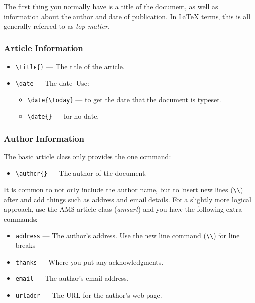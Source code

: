 \documentclass{article}  %
\begin{document}
The first thing you normally have is a title of the document, as well as
information about the author and date of publication.  In \LaTeX{} terms,
this is all generally referred to as \emph{top matter}.

\subsubsection{Article Information}
\label{sec:article-information}

\begin{itemize}
\item \verb|\title{}| --- The title of the article.
\item \verb|\date| --- The date. Use:
  \begin{itemize}
  \item \verb|\date{\today}| --- to get the date that the document is typeset.
  \item \verb|\date{}| --- for no date.
  \end{itemize}
\end{itemize}

\subsubsection{Author Information}
\label{sec:author-information}
  
The basic article class only provides the one command:
\begin{itemize}
\item \verb|\author{}| --- The author of the document.
\end{itemize}

It is common to not only include the author name, but to insert new lines (\verb|\\|)
after and add things such as address and email details.  For a slightly more logical
approach, use the AMS article class (\emph{amsart}) and you have the following extra
commands:
  
\begin{itemize}
\item \verb|address| --- The author's address.  Use the new line command (\verb|\\|) for
  line breaks.
\item \verb|thanks| --- Where you put any acknowledgments.
\item \verb|email| --- The author's email address.
\item \verb|urladdr| --- The URL for the author's web page.
\end{itemize}
\end{document}

